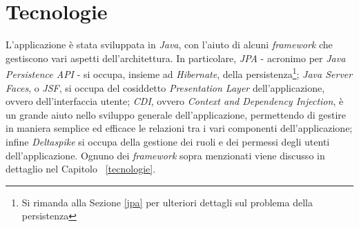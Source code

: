 \begin{comment}
\paragraph{Casi d'Uso}
Il diagramma dei Casi d'Uso descrive l'insieme delle funzionalità dell'applicazione, mettendo in evidenza come usarle e chi le usa. In questo modo, per esempio, si specifica che è un Operatore che si occupa dell'\textsl{Inserimento di una Convenzione/Contributo}, e non un Responsabile Scientifico.\newline
Il diagramma dei Casi d'Uso è una specifica di alto livello di ciò che l'applicazione deve fare, ed è per questo che è fondamentale per lo sviluppo iniziale di un'applicazione: gli sviluppatori e gli \textsl{Stakeholders} - chi ha interesse nello sviluppo dell'applicazione - si possono mettere d'accordo su cosa l'applicazione deve fare, e come lo deve fare, cioè come l'utente deve interagire con il sistema; spesso quest'ultimo punto viene specificato in termini di \textsl{Mockups}, ovvero di disegni che prototipizzino quella che diventerà l'interfaccia utente.
\end{comment}

\section{Tecnologie}
L'applicazione è stata sviluppata in \textsl{Java}, con l'aiuto di alcuni \textit{framework} che gestiscono vari aspetti dell'architettura. In particolare, \textsl{JPA} - acronimo per \textsl{Java Persistence API} - si occupa, insieme ad \textsl{Hibernate}, della persistenza\footnote{Si rimanda alla Sezione \ref{jpa} per ulteriori dettagli sul problema della persistenza}; \textsl{Java Server Faces}, o \textsl{JSF}, si occupa del cosiddetto \textsl{Presentation Layer} dell'applicazione, ovvero dell'interfaccia utente; \textsl{CDI}, ovvero \textsl{Context and Dependency Injection}, è un grande aiuto nello sviluppo generale dell'applicazione, permettendo di gestire in maniera semplice ed efficace le relazioni tra i vari componenti dell'applicazione; infine \textsl{Deltaspike} si occupa della gestione dei ruoli e dei permessi degli utenti dell'applicazione.\newline
Ognuno dei \textit{framework} sopra menzionati viene discusso in dettaglio  nel Capitolo ~\ref{tecnologie}.

\begin{comment}
\section{Utilizzo}
Il Capitolo \ref{howto} spiega come si usa l'applicazione, descrivendo come utilizzare ognuna delle funzionalità dell'applicazione. In realtà, l'interfaccia di Jama non è complicata, ma è sempre bene far vedere in maniera esatta come si usa. Verranno inclusi \textit{screenshot} e spiegazioni dettagliate di ogni aspetto dell'applicazione: dalla creazione di una convenzione, alla sua modifica, alla visualizzazione, a tutte le altre funzionalità.
\end{comment}

